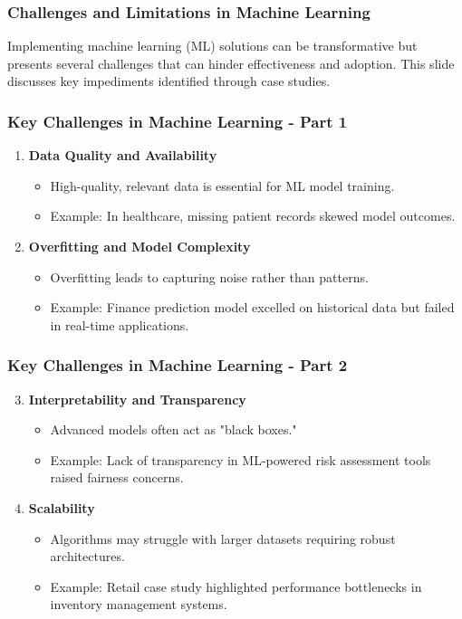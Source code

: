 \documentclass[aspectratio=169]{beamer}
\begin{document}
\begin{frame}[fragile]
    \frametitle{Challenges and Limitations in Machine Learning}
    
    Implementing machine learning (ML) solutions can be transformative but presents several challenges that can hinder effectiveness and adoption. This slide discusses key impediments identified through case studies.
\end{frame}

\begin{frame}[fragile]
    \frametitle{Key Challenges in Machine Learning - Part 1}
    \begin{enumerate}
        \item \textbf{Data Quality and Availability}
            \begin{itemize}
                \item High-quality, relevant data is essential for ML model training.
                \item Example: In healthcare, missing patient records skewed model outcomes.
            \end{itemize}
        \item \textbf{Overfitting and Model Complexity}
            \begin{itemize}
                \item Overfitting leads to capturing noise rather than patterns.
                \item Example: Finance prediction model excelled on historical data but failed in real-time applications.
            \end{itemize}
    \end{enumerate}
\end{frame}

\begin{frame}[fragile]
    \frametitle{Key Challenges in Machine Learning - Part 2}
    \begin{enumerate}
        \setcounter{enumi}{2}
        \item \textbf{Interpretability and Transparency}
            \begin{itemize}
                \item Advanced models often act as "black boxes."
                \item Example: Lack of transparency in ML-powered risk assessment tools raised fairness concerns.
            \end{itemize}
        \item \textbf{Scalability}
            \begin{itemize}
                \item Algorithms may struggle with larger datasets requiring robust architectures.
                \item Example: Retail case study highlighted performance bottlenecks in inventory management systems.
            \end{itemize}
    \end{enumerate}
\end{frame}
\end{document}
